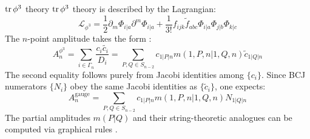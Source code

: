 \documentclass{beamer}
\begin{document}
\begin{frame}{$\tr\phi^3$ theory}\label{phi3}
	$\tr\phi^3$ theory is described by the Lagrangian:
	\begin{equation*}
		\mathcal{L}_{\phi^{3}}=\frac{1}{2}\partial_{m}\Phi_{i|a}\partial^{m}\Phi_{i|a}+\frac{1}{3!}f_{ijk}\tilde{f}_{abc}\Phi_{i|a}\Phi_{j|b}\Phi_{k|c}
	\end{equation*}
	The $n$-point amplitude takes the form \cite{Cachazo:2013iea}:
	\begin{equation*}
		A_n^{\phi^3}=\sum_{i\in\Gamma_n}\frac{c_i\tilde{c_i}}{D_i}=\sum_{P,Q\in S_{n-2}}c_{1|P|n}m(1,P,n|1,Q,n)\tilde{c}_{1|Q|n}
	\end{equation*}
	The second equality follows purely from Jacobi identities among $\{c_i\}$. Since BCJ numerators $\{N_i\}$ obey the same Jacobi identities as $\{\tilde{c}_i\}$, one expects:
	\begin{equation*}
		A_n^\mathrm{gauge}=\sum_{P,Q\in S_{n-2}}c_{1|P|n}m(1,P,n|1,Q,n)N_{1|Q|n}
	\end{equation*}
	The partial amplitudes $m(P|Q)$ and their string-theoretic analogues can be computed via graphical rules \cite{Mizera:2016jhj}.
\end{frame}

\begin{frame}[allowframebreaks]
\printbibliography
\end{frame}
\end{document}
